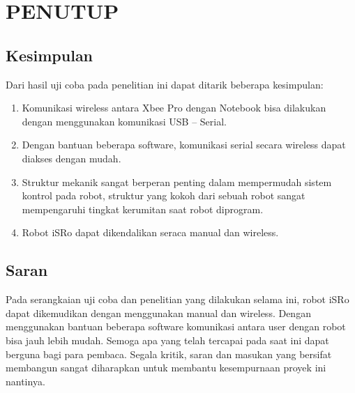 \chapter{PENUTUP}

\ifpdf
    \graphicspath{{Chapter5/Figs/Raster/}{Chapter5/Figs/PDF/}{Chapter5/Figs/}}
\else
    \graphicspath{{Chapter5/Figs/Vector/}{Chapter5/Figs/}}
\fi

\section{Kesimpulan}
Dari hasil uji coba pada penelitian ini dapat ditarik beberapa kesimpulan:
\begin{enumerate}
\item Komunikasi wireless antara Xbee Pro dengan Notebook bisa dilakukan dengan menggunakan komunikasi USB – Serial. 
\item Dengan bantuan beberapa software, komunikasi serial secara wireless dapat diakses dengan mudah.
\item Struktur mekanik sangat berperan penting dalam mempermudah sistem kontrol pada robot, struktur yang kokoh dari sebuah robot sangat mempengaruhi tingkat kerumitan saat robot diprogram.
\item Robot iSRo dapat dikendalikan seraca manual dan wireless.
\end{enumerate}

\section{Saran}
Pada serangkaian uji coba dan penelitian yang dilakukan selama ini, robot iSRo dapat dikemudikan dengan menggunakan manual dan wireless. Dengan menggunakan bantuan beberapa software komunikasi antara user dengan robot bisa jauh lebih mudah. Semoga apa yang telah  tercapai pada saat ini dapat berguna bagi para pembaca. Segala kritik, saran dan masukan yang bersifat membangun sangat diharapkan untuk membantu kesempurnaan proyek ini nantinya.